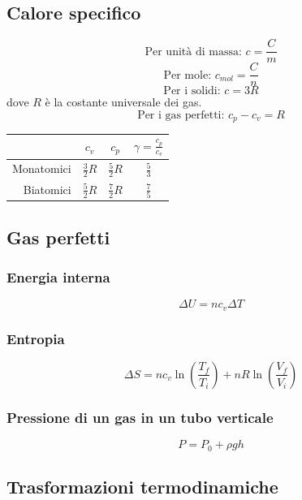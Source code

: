 \documentclass[a4paper]{article}
\theoremstyle{break}
\theoremstyle{break}
\theoremstyle{break}
\theoremstyle{break}
\begin{document}
\subsection{Calore specifico}
\[
  \text{Per unità di massa: }  c = \frac{C}{m}
\] 
\[
  \text{Per mole: } c_{mol} = \frac{C}{n}
\] 
\[
\text{Per i solidi: } c = 3R
\] 
dove \( R \) è la costante universale dei gas.
\[
\text{Per i gas perfetti: } c_p - c_v = R
\] 
\begin{table}[H]
  \centering
  \begin{tabular}{r|c|c|c}
    & \( c_v \) & \( c_p \) & \( \gamma = \frac{c_p}{c_v} \) \\[0.2cm]
    \hline
    Monatomici & \( \frac{3}{2} R \) & \( \frac{5}{2} R \) & \(\frac{5}{3}\) \\[0.2cm]
    Biatomici & \( \frac{5}{2} R \) & \( \frac{7}{2} R \) & \(\frac{7}{5}\) \\
  \end{tabular}
\end{table}

\subsection{Gas perfetti}
\subsubsection{Energia interna}
\[
\Delta U = n c_v \Delta T
\] 

\subsubsection{Entropia}
\[
\Delta S = n c_v \ln \left( \frac{T_f}{T_i} \right) + n R \ln \left( \frac{V_f}{V_i} \right)
\] 

\subsubsection{Pressione di un gas in un tubo verticale}
\[
P = P_0 + \rho g h
\] 

\subsection{Trasformazioni termodinamiche}
\end{document}
